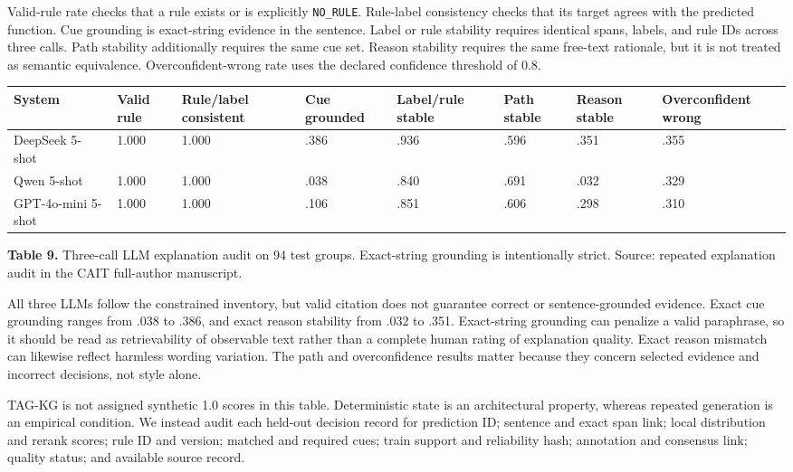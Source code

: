 \documentclass{CUP-JNL-NLP}
\begin{document}
Valid-rule rate checks that a rule exists or is explicitly \texttt{NO\_RULE}. Rule-label consistency checks that its target agrees with the predicted function. Cue grounding is exact-string evidence in the sentence. Label or rule stability requires identical spans, labels, and rule IDs across three calls. Path stability additionally requires the same cue set. Reason stability requires the same free-text rationale, but it is not treated as semantic equivalence. Overconfident-wrong rate uses the declared confidence threshold of 0.8.

\begin{table}[htbp]\centering\small\begin{tabularx}{\linewidth}{lXXXXXXX}\toprule
System & Valid rule & Rule/label consistent & Cue grounded & Label/rule stable & Path stable & Reason stable & Overconfident wrong \\ \midrule
DeepSeek 5-shot & 1.000 & 1.000 & .386 & .936 & .596 & .351 & .355 \\
Qwen 5-shot & 1.000 & 1.000 & .038 & .840 & .691 & .032 & .329 \\
GPT-4o-mini 5-shot & 1.000 & 1.000 & .106 & .851 & .606 & .298 & .310 \\
\bottomrule\end{tabularx}\end{table}
\textbf{Table 9.} Three-call LLM explanation audit on 94 test groups. Exact-string grounding is intentionally strict. Source: repeated explanation audit in the CAIT full-author manuscript.

All three LLMs follow the constrained inventory, but valid citation does not guarantee correct or sentence-grounded evidence. Exact cue grounding ranges from .038 to .386, and exact reason stability from .032 to .351. Exact-string grounding can penalize a valid paraphrase, so it should be read as retrievability of observable text rather than a complete human rating of explanation quality. Exact reason mismatch can likewise reflect harmless wording variation. The path and overconfidence results matter because they concern selected evidence and incorrect decisions, not style alone.

TAG-KG is not assigned synthetic 1.0 scores in this table. Deterministic state is an architectural property, whereas repeated generation is an empirical condition. We instead audit each held-out decision record for prediction ID; sentence and exact span link; local distribution and rerank scores; rule ID and version; matched and required cues; train support and reliability hash; annotation and consensus link; quality status; and available source record.
\end{document}
